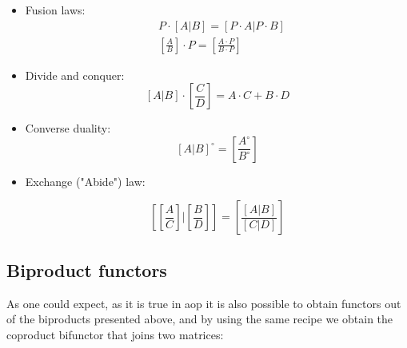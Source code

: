 \documentclass[
  oneside,
  11pt, a4paper,
  footinclude=true,
  headinclude=true,
  cleardoublepage=empty
]{scrbook}
\theoremstyle{definition}
\theoremstyle{definition}
\begin{document}
        \begin{itemize}
            \item Fusion laws:
            \begin{align}
                & P \cdot \left[A|B\right] = \left[P \cdot A | P \cdot B\right] \\
                & \left[\frac{A}{B}\right] \cdot P = \left[\frac{A \cdot P}{B \cdot P}\right]
            \end{align}
            \item Divide and conquer:
            \begin{equation}
                \left[A | B\right] \cdot \left[\frac{C}{D}\right] = A \cdot C + B \cdot D
            \end{equation}
            \item Converse duality:
            \begin{equation}
                \left[A | B\right]^\circ = \left[\frac{A^\circ}{B^\circ}\right]
            \end{equation}
            \item Exchange ("Abide") law:
            
            \begin{equation}
                \left[\left[\frac{A}{C}\right] | \left[\frac{B}{D}\right]\right] = \left[\frac{\left[A | B\right]}{\left[C | D\right]}\right]
            \end{equation}
        \end{itemize}{}
        
        \subsection{Biproduct functors}
        
        As one could expect, as it is true in \gls{aop} it is also possible to obtain functors out of the biproducts presented above, and by using the same recipe we obtain the coproduct bifunctor that joins two matrices:
        
        \begin{center}
        \end{center}{}
        
\end{document}
